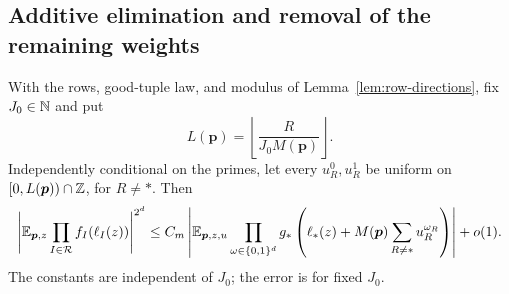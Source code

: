 \subsection{Additive elimination and removal of the remaining weights}

\begin{lemma}
\label{lem:additive-elimination}
With the rows, good-tuple law, and modulus of
Lemma~\ref{lem:row-directions}, fix $J_0\in\mathbb N$ and put
\begin{equation}
 L(\boldsymbol p)=\left\lfloor\frac{R}{J_0M(\boldsymbol p)}\right\rfloor.
 \label{eq:correlation-shift-length}
\end{equation}
Independently conditional on the primes, let every $u_R^0,u_R^1$ be
uniform on $[0,L(\boldsymbol p))\cap\mathbb Z$, for $R\ne *$.
Then
\begin{equation}
 \left|\mathbb E_{\boldsymbol p,z}\prod_{I\in\mathcal R}f_I(\ell_I(z))
 \right|^{2^d}
 \le C_m\left|\mathbb E_{\boldsymbol p,z,u}
       \prod_{\omega\in\{0,1\}^d}
       g_*\left(\ell_*(z)+M(\boldsymbol p)
                    \sum_{R\ne *}u_R^{\omega_R}\right)\right|+o(1).
 \label{eq:additive-elimination-output}
\end{equation}
The constants are independent of $J_0$; the error is for fixed $J_0$.
\end{lemma}

